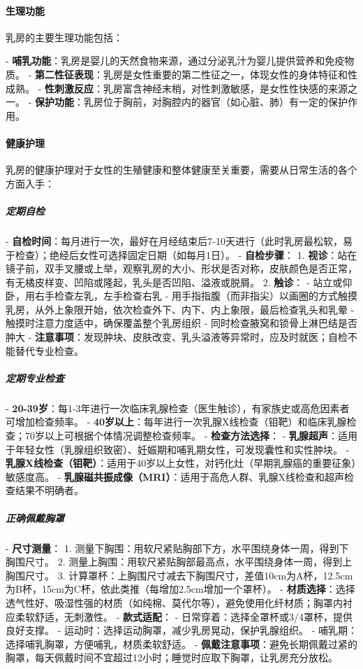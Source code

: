 \begin{enumerate}
\paragraph{生理功能}

乳房的主要生理功能包括：

- \textbf{哺乳功能}：乳房是婴儿的天然食物来源，通过分泌乳汁为婴儿提供营养和免疫物质。
- \textbf{第二性征表现}：乳房是女性重要的第二性征之一，体现女性的身体特征和性成熟。
- \textbf{性刺激反应}：乳房富含神经末梢，对性刺激敏感，是女性性快感的来源之一。
- \textbf{保护功能}：乳房位于胸前，对胸腔内的器官（如心脏、肺）有一定的保护作用。

\paragraph{健康护理}

乳房的健康护理对于女性的生殖健康和整体健康至关重要，需要从日常生活的各个方面入手：

\subparagraph{定期自检}
- \textbf{自检时间}：每月进行一次，最好在月经结束后7-10天进行（此时乳房最松软，易于检查）；绝经后女性可选择固定日期（如每月1日）。
- \textbf{自检步骤}：
  1. \textbf{视诊}：站在镜子前，双手叉腰或上举，观察乳房的大小、形状是否对称，皮肤颜色是否正常，有无橘皮样变、凹陷或隆起，乳头是否凹陷、溢液或脱屑。
  2. \textbf{触诊}：
     - 站立或仰卧，用右手检查左乳，左手检查右乳
     - 用手指指腹（而非指尖）以画圈的方式触摸乳房，从外上象限开始，依次检查外下、内下、内上象限，最后检查乳头和乳晕
     - 触摸时注意力度适中，确保覆盖整个乳房组织
     - 同时检查腋窝和锁骨上淋巴结是否肿大
- \textbf{注意事项}：发现肿块、皮肤改变、乳头溢液等异常时，应及时就医；自检不能替代专业检查。

\subparagraph{定期专业检查}
- \textbf{20-39岁}：每1-3年进行一次临床乳腺检查（医生触诊），有家族史或高危因素者可增加检查频率。
- \textbf{40岁以上}：每年进行一次乳腺X线检查（钼靶）和临床乳腺检查；70岁以上可根据个体情况调整检查频率。
- \textbf{检查方法选择}：
  - \textbf{乳腺超声}：适用于年轻女性（乳腺组织致密）、妊娠期和哺乳期女性，可发现囊性和实性肿块。
  - \textbf{乳腺X线检查（钼靶）}：适用于40岁以上女性，对钙化灶（早期乳腺癌的重要征象）敏感度高。
  - \textbf{乳腺磁共振成像（MRI）}：适用于高危人群、乳腺X线检查和超声检查结果不明确者。

\subparagraph{正确佩戴胸罩}
- \textbf{尺寸测量}：
  1. 测量下胸围：用软尺紧贴胸部下方，水平围绕身体一周，得到下胸围尺寸。
  2. 测量上胸围：用软尺紧贴胸部最高点，水平围绕身体一周，得到上胸围尺寸。
  3. 计算罩杯：上胸围尺寸减去下胸围尺寸，差值10cm为A杯，12.5cm为B杯，15cm为C杯，依此类推（每增加2.5cm增加一个罩杯）。
- \textbf{材质选择}：选择透气性好、吸湿性强的材质（如纯棉、莫代尔等），避免使用化纤材质；胸罩内衬应柔软舒适，无刺激性。
- \textbf{款式适配}：
  - 日常穿着：选择全罩杯或3/4罩杯，提供良好支撑。
  - 运动时：选择运动胸罩，减少乳房晃动，保护乳腺组织。
  - 哺乳期：选择哺乳胸罩，方便哺乳，材质柔软舒适。
- \textbf{佩戴注意事项}：避免长期佩戴过紧的胸罩，每天佩戴时间不宜超过12小时；睡觉时应取下胸罩，让乳房充分放松。


\end{enumerate}
